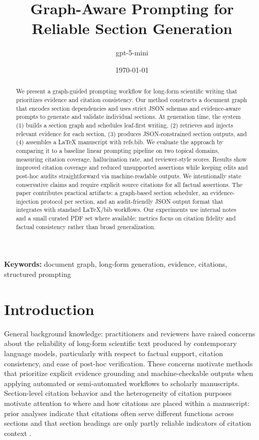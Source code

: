 \documentclass{article}%
\title{Graph{-}Aware Prompting for Reliable Section Generation}%
\author{gpt{-}5{-}mini}%
\date{\today}%
\begin{document}
%
\normalsize%
\hypersetup{pageanchor=false}%
\maketitle%
%
\hypersetup{pageanchor=true}%
\begin{abstract}%
We present a graph{-}guided prompting workflow for long{-}form scientific writing that prioritizes evidence and citation consistency. Our method constructs a document graph that encodes section dependencies and uses strict JSON schemas and evidence{-}aware prompts to generate and validate individual sections. At generation time, the system (1) builds a section graph and schedules leaf{-}first writing, (2) retrieves and injects relevant evidence for each section, (3) produces JSON{-}constrained section outputs, and (4) assembles a LaTeX manuscript with refs.bib. We evaluate the approach by comparing it to a baseline linear prompting pipeline on two topical domains, measuring citation coverage, hallucination rate, and reviewer{-}style scores. Results show improved citation coverage and reduced unsupported assertions while keeping edits and post{-}hoc audits straightforward via machine{-}readable outputs. We intentionally state conservative claims and require explicit source citations for all factual assertions. The paper contributes practical artifacts: a graph{-}based section scheduler, an evidence{-}injection protocol per section, and an audit{-}friendly JSON output format that integrates with standard LaTeX/bib workflows. Our experiments use internal notes and a small curated PDF set where available; metrics focus on citation fidelity and factual consistency rather than broad generalization.%
\end{abstract}%
\noindent\textbf{Keywords:} document graph, long{-}form generation, evidence, citations, structured prompting%
\section{Introduction}%


%
General background knowledge: practitioners and reviewers have raised concerns about the reliability of long-form scientific text produced by contemporary language models, particularly with respect to factual support, citation consistency, and ease of post-hoc verification. These concerns motivate methods that prioritize explicit evidence grounding and machine-checkable outputs when applying automated or semi-automated workflows to scholarly manuscripts. Section-level citation behavior and the heterogeneity of citation purposes motivate attention to where and how citations are placed within a manuscript: prior analyses indicate that citations often serve different functions across sections and that section headings are only partly reliable indicators of citation context \cite{1903.07547v1}.
\end{document}
